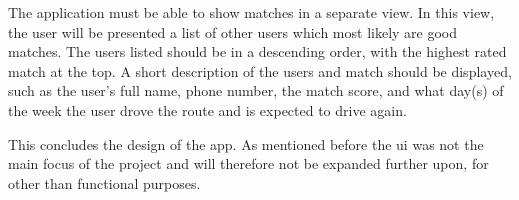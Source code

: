 The application must be able to show matches in a separate view.
In this view, the user will be presented a list of other users which most likely are good matches. 
The users listed should be in a descending order, with the highest rated match at the top.
A short description of the users and match should be displayed, such as the user's full name, phone number, the match score, and what day(s) of the week the user drove the route and is expected to drive again.

This concludes the design of the app.
As mentioned before the \gls{ui} was not the main focus of the project and will therefore not be expanded further upon, for other than functional purposes.



